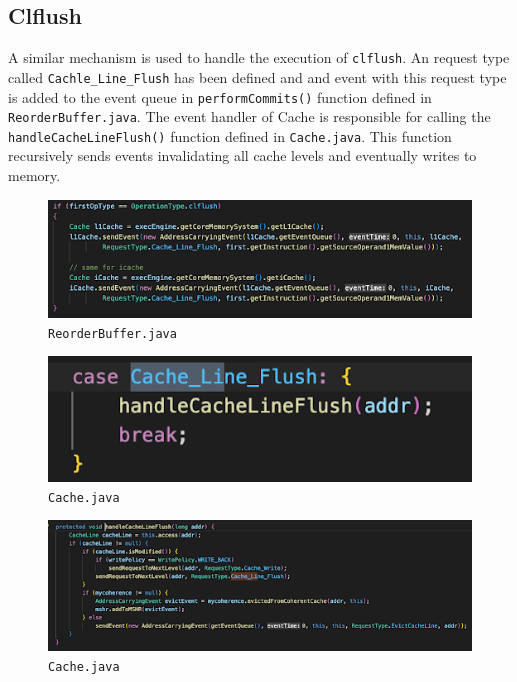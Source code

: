 \documentclass[11pt]{article}
\begin{document}
\subsection{Clflush}
A similar mechanism is used to handle the execution of \texttt{clflush}. An request type called \texttt{Cachle\_Line\_Flush} has been defined and and event with this request type is added to the event queue in \texttt{performCommits()} function defined in \texttt{ReorderBuffer.java}. The event handler of Cache is responsible for calling the \texttt{handleCacheLineFlush()} function defined in \texttt{Cache.java}. This function recursively sends events invalidating all cache levels and eventually writes to memory.
\begin{figure}[H]
\centering
\includegraphics[scale = 0.6]{screenshots/ReorderBufferClflush.png}
\caption{\texttt{ReorderBuffer.java}}
\label{fig:RBSys}
\end{figure}
\begin{figure}[H]
\centering
\includegraphics[scale = 0.4]{screenshots/CacheHandleEvent.png}
\caption{\texttt{Cache.java}}
\label{fig:TLBHE}
\end{figure}
\begin{figure}[H]
\centering
\includegraphics[scale = 0.6]{screenshots/CacheFlush.png}
\caption{\texttt{Cache.java}}
\label{fig:TLBFlush}
\end{figure}
\end{document}
